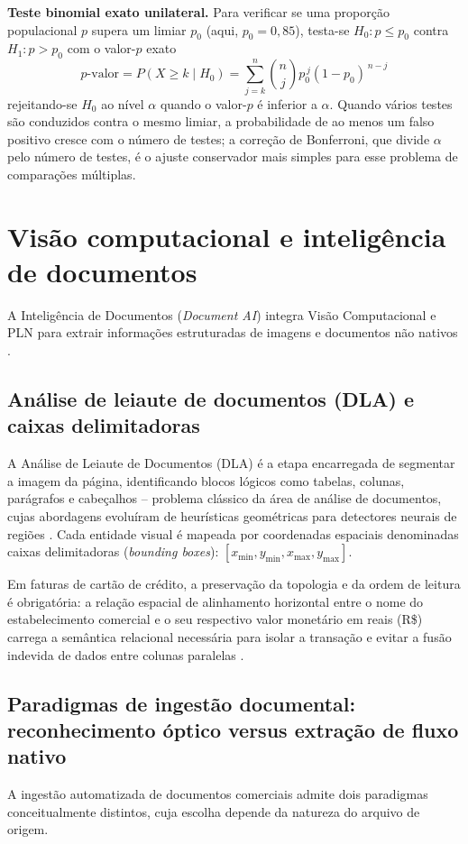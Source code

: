 \textbf{Teste binomial exato unilateral.} Para verificar se uma proporção populacional $p$ supera um limiar $p_0$ (aqui, $p_0 = 0{,}85$), testa-se $H_0\!: p \le p_0$ contra $H_1\!: p > p_0$ com o valor-$p$ exato
\begin{equation}
	\label{eq:binomial}
	p\text{-valor} = P(X \ge k \mid H_0) = \sum_{j=k}^{n} \binom{n}{j} p_0^{\,j} (1 - p_0)^{\,n-j}
\end{equation}
rejeitando-se $H_0$ ao nível $\alpha$ quando o valor-$p$ é inferior a $\alpha$. Quando vários testes são conduzidos contra o mesmo limiar, a probabilidade de ao menos um falso positivo cresce com o número de testes; a correção de Bonferroni, que divide $\alpha$ pelo número de testes, é o ajuste conservador mais simples para esse problema de comparações múltiplas.

\section{Visão computacional e inteligência de documentos}
\label{sec:fund_visao_ocr}

A Inteligência de Documentos (\textit{Document AI}) integra Visão Computacional e PLN para extrair informações estruturadas de imagens e documentos não nativos \cite{docling2024}.

\subsection{Análise de leiaute de documentos (DLA) e caixas delimitadoras}
\label{sec:fund_dla}
A Análise de Leiaute de Documentos (DLA) é a etapa encarregada de segmentar a imagem da página, identificando blocos lógicos como tabelas, colunas, parágrafos e cabeçalhos -- problema clássico da área de análise de documentos, cujas abordagens evoluíram de heurísticas geométricas para detectores neurais de regiões \cite{binmakhashen2019document}. Cada entidade visual é mapeada por coordenadas espaciais denominadas caixas delimitadoras (\textit{bounding boxes}): $[x_{\min}, y_{\min}, x_{\max}, y_{\max}]$.

Em faturas de cartão de crédito, a preservação da topologia e da ordem de leitura é obrigatória: a relação espacial de alinhamento horizontal entre o nome do estabelecimento comercial e o seu respectivo valor monetário em reais (R\$) carrega a semântica relacional necessária para isolar a transação e evitar a fusão indevida de dados entre colunas paralelas \cite{docling2024}.

\subsection{Paradigmas de ingestão documental: reconhecimento óptico versus extração de fluxo nativo}
\label{sec:fund_paradigmas_ingestao}
A ingestão automatizada de documentos comerciais admite dois paradigmas conceitualmente distintos, cuja escolha depende da natureza do arquivo de origem.

